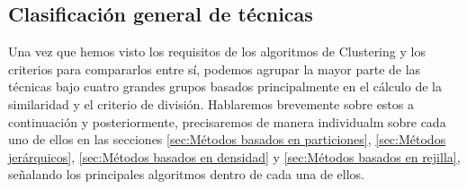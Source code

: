 \documentclass[3p,twocolumn]{elsarticle}
\begin{document}


\subsection{\textbf{Clasificación general de técnicas}} \label{subsec:Clasificación general de técnicas}

\cite{16} Una vez que hemos visto los requisitos de los algoritmos de Clustering y los criterios para compararlos entre sí, podemos agrupar la mayor parte de las técnicas bajo cuatro grandes grupos basados principalmente en el cálculo de la similaridad y el criterio de división. Hablaremos brevemente sobre estos a continuación y posteriormente, precisaremos de manera individualm sobre cada uno de ellos en las secciones \ref{sec:Métodos basados en particiones}, \ref{sec:Métodos jerárquicos}, \ref{sec:Métodos basados en densidad} y \ref{sec:Métodos basados en rejilla}, señalando los principales algoritmos dentro de cada una de ellos.
\end{document}
